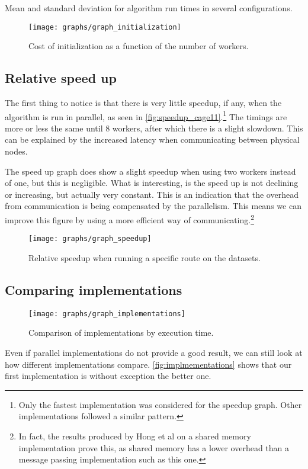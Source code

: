 \begin{table}
    \centering
    
    
    \caption{Mean and standard deviation for algorithm run times in several configurations.}
\end{table}

\begin{figure}
	\texttt{[image: graphs/graph\_initialization]}
  \caption{Cost of initialization as a function of the number of workers.}
  \label{fig:initialization_time}
\end{figure}

\subsection{Relative speed up}
The first thing to notice is that there is very little speedup, if any, when the algorithm is run in parallel, as seen in \autoref{fig:speedup_cage11}.\footnote{Only the fastest implementation was considered for the speedup graph. Other implementations followed a similar pattern.} The timings are more or less the same until 8 workers, after which there is a slight slowdown. This can be explained by the increased latency when communicating between physical nodes.

The speed up graph does show a slight speedup when using two workers instead of one, but this is negligible. What is interesting, is the speed up is not declining or increasing, but actually very constant. This is an indication that the overhead from communication is being compensated by the parallelism. This means we can improve this figure by using a more efficient way of communicating.\footnote{In fact, the results produced by Hong et al \cite{LockFreeMultithreadedMaxFlow} on a shared memory implementation prove this, as shared memory has a lower overhead than a message passing implementation such as this one.}

\begin{figure}
  \texttt{[image: graphs/graph\_speedup]}
  \caption{Relative speedup when running a specific route on the datasets.}
  \label{fig:speedup_cage11}
\end{figure}

\subsection{Comparing implementations}

\begin{figure}
  \texttt{[image: graphs/graph\_implementations]}
  \caption{Comparison of implementations by execution time.}
  \label{fig:implmementations}
\end{figure}

Even if parallel implementations do not provide a good result, we can still look at how different implementations compare. \autoref{fig:implmementations} shows that our first implementation is without exception the better one.
